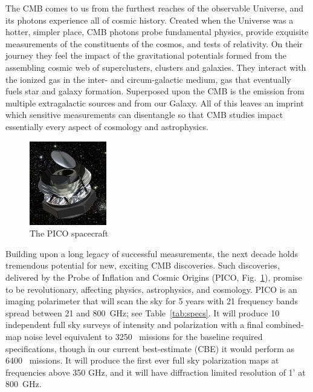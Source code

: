 \documentclass[PICOReport.tex]{subfiles}
\begin{document}

The \ac{CMB} comes to us from the furthest reaches of the observable Universe, and its photons experience all of cosmic history.  Created when the Universe was a hotter, simpler place, CMB photons probe fundamental physics, provide exquisite measurements of the constituents of the cosmos, and tests of relativity.  On their journey they feel the impact of the gravitational potentials formed from the assembling cosmic web of superclusters, clusters and galaxies.  They interact with the ionized gas in the inter- and circum-galactic medium, gas that eventually fuels star and galaxy formation.  Superposed upon the CMB is the emission from multiple extragalactic sources and from our Galaxy.  All of this leaves an imprint which sensitive measurements can disentangle so that CMB studies impact essentially every aspect of cosmology and astrophysics.

\begin{figure}  %
\includegraphics[width=0.30\textwidth]{figures/PICO_rendered.jpg}
\vspace{-0.25in}
\caption{\captiontext The PICO spacecraft 
\label{fig:pico_rendered} }
\end{figure}

Building upon a long legacy of successful measurements, the next decade holds tremendous potential for new, exciting \ac{CMB} discoveries.  Such discoveries, delivered by the Probe of Inflation and Cosmic Origins (PICO, Fig.~\ref{fig:pico_rendered}), promise to be revolutionary, affecting physics, astrophysics, and cosmology. PICO is an imaging polarimeter that will scan the sky for 5 years with 21 frequency bands spread between 21 and 800~GHz; see Table~\ref{tab:specs}. It will produce 10 independent full sky surveys of intensity and polarization with a final combined-map noise level equivalent to 3250 \planck\ missions for the baseline required specifications, though in our current best-estimate (CBE) it would perform as 6400 \planck\ missions.  It will produce the first ever full sky polarization maps at frequencies above 350 GHz, and it will have diffraction limited resolution of 1' at 800~GHz. 
\end{document}
